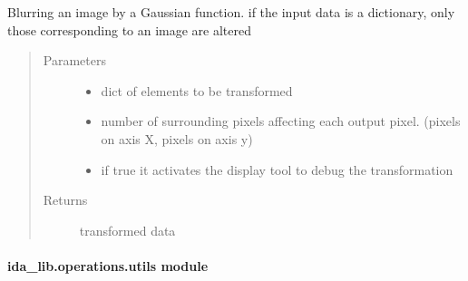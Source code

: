 \documentclass[letterpaper,10pt,english]{sphinxmanual}
\begin{document}
\begin{fulllineitems}
\label{\detokenize{ida_lib.operations:ida_lib.operations.transforms.gaussian_blur}}
Blurring an image by a Gaussian function.  if the input data is a dictionary, only those corresponding to an
image are altered
\begin{quote}\begin{description}
\item[{Parameters}] \leavevmode\begin{itemize}
\item {} 
 \textendash{} dict of elements to be transformed

\item {} 
 \textendash{} number of surrounding pixels affecting each output pixel. (pixels on axis X, pixels on axis y)

\item {} 
 \textendash{} if true it activates the display tool to debug the transformation

\end{itemize}

\item[{Returns}] \leavevmode
transformed data

\end{description}\end{quote}

\end{fulllineitems}



\paragraph{ida\_lib.operations.utils module}
\label{\detokenize{ida_lib.operations:module-ida_lib.operations.utils}}\label{\detokenize{ida_lib.operations:ida-lib-operations-utils-module}}
\end{document}
